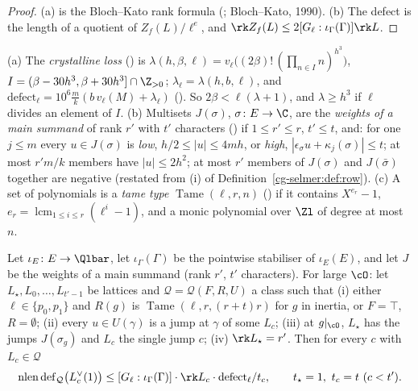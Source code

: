 \begin{proof}
(a) is the Bloch--Kato rank formula (; Bloch--Kato, 1990). (b)
The defect is the length of a quotient of $Z_f(L)/\ell^e$, and $\rk Z_f(L)\le2[G_\ell:\iota_\Gamma(\Gamma)]\rk L$.
\end{proof}

\begin{definition}\label{cg-lifting:def:loss}
(a) The \emph{crystalline loss} () is
$\lambda(h,\beta,\ell)=v_\ell\bigl((2\beta)!\,(\prod_{n\in I}n)^{h^3}\bigr)$,
$I=(\beta-30h^3,\beta+30h^3]\cap\Z_{>0}$; $\lambda_\ell=\lambda(h,b,\ell)$, and
$\mathrm{defect}_\ell=10^6\frac mk(b\,v_\ell(M)+\lambda_\ell)$
(). So $2\beta<\ell(\lambda+1)$, and $\lambda\ge h^3$ if $\ell$ divides an
element of $I$.
(b) Multisets $J(\sigma)$, $\sigma\colon E\to\C$, are the \emph{weights of a main summand} of rank
$r'$ with $t'$ characters () if $1\le r'\le r$, $t'\le t$,
and: for one $j\le m$ every $u\in J(\sigma)$ is \emph{low}, $h/2\le|u|\le4mh$, or \emph{high},
$|\epsilon_\sigma u+\kappa_j(\sigma)|\le t$; at most $r'm/k$ members have $|u|\le2h^2$; at most $r'$
members of $J(\sigma)$ and $J(\bar\sigma)$ together are negative (restated from (i) of
Definition~\ref{cg-selmer:def:row}).
(c) A set of polynomials is a \emph{tame type} $\operatorname{Tame}(\ell,r,n)$
() if it contains $X^{e_r}-1$, $e_r=\operatorname{lcm}_{1\le i\le r}(\ell^i-1)$,
and a monic polynomial over $\Zl$ of degree at most $n$.
\end{definition}

\begin{theorem}\label{cg-lifting:thm:main}
Let $\iota_E\colon E\to\Qlbar$, let $\iota_\Gamma(\Gamma)$ be the pointwise stabiliser of $\iota_E(E)$, and let $J$ be the weights of a
main summand (rank $r'$, $t'$ characters). For large $\cO$: let $L_\star,L_0,\dots,L_{t'-1}$ be
lattices and $\mathcal Q=\mathcal Q(F,R,U)$ a class such that (i) either $\ell\in\{p_0,p_1\}$ and
$R(g)$ is $\operatorname{Tame}(\ell,r,(r+t)r)$ for $g$ in inertia, or $F=\top$, $R=\emptyset$; (ii)
every $u\in U(\gamma)$ is a jump at $\gamma$ of some $L_c$; (iii) at $g|_\cO$, $L_\star$ has the jumps
$J(\sigma_g)$ and $L_c$ the single jump $c$; (iv) $\rk L_\star=r'$. Then for every $c$ with
$L_c\in\mathcal Q$
\[
  \operatorname{nlen}\operatorname{def}_{\mathcal Q}\bigl(L_c^\vee(1)\bigr)
  \le[G_\ell:\iota_\Gamma(\Gamma)]\cdot\rk L_c\cdot\mathrm{defect}_\ell/t_c,
  \qquad t_\star=1,\ t_c=t\ (c<t').
\]
\end{theorem}

